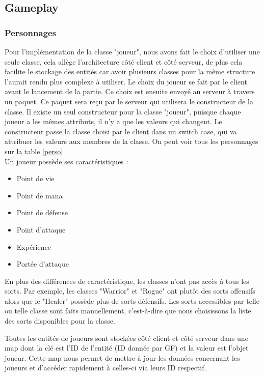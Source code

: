 \documentclass[a4paper, 12pt, twoside]{article}
\begin{document}
\subsection{Gameplay}

\subsubsection{Personnages}
Pour l'implémentation de la classe "joueur", nous avons fait le choix d'utiliser une seule classe, cela allège l'architecture côté client et côté serveur, de plus cela facilite le stockage des entités car avoir plusieurs classes pour la même structure l'aurait rendu plus complexe à utiliser. Le choix du joueur se fait par le client avant le lancement de la partie. Ce choix est ensuite envoyé au serveur à travers un paquet. Ce paquet sera reçu par le serveur qui utilisera le constructeur de la classe. Il existe un seul constructeur pour la classe "joueur", puisque chaque joueur a les mêmes attributs, il n'y a que les valeurs qui changent. Le constructeur passe la classe choisi par le client dans un switch case, qui va attribuer les valeurs aux membres de la classe. On peut voir tous les personnages sur la table \ref{perso} \\ 
Un joueur possède ses caractéristiques : \\
\begin{table}[h]
\begin{center}
    \begin{minipage}{10cm}
        \begin{itemize}
            \item Point de vie
            \item Point de mana
            \item Point de défense 
            \item Point d'attaque 
            \item Expérience 
            \item Portée d'attaque
        \end{itemize}
    \end{minipage}
\end{center}
\end{table}
En plus des différences de caractéristique, les classes n'ont pas accès à tous les sorts. Par exemple, les classes "Warrior" et "Rogue" ont plutôt des sorts offensifs alors que le "Healer" possède plus de sorts défensifs. Les sorts accessibles par telle ou telle classe sont faits manuellement, c'est-à-dire que nous choisissons la liste des sorts disponibles pour la classe. \par
Toutes les entités de joueurs sont stockées côté client et côté serveur dans une map dont la clé est l'ID de l'entité (ID donnée par GF) et la valeur est l'objet joueur. Cette map nous permet de mettre à jour les données concernant les joueurs et d'accéder rapidement à celles-ci via leurs ID respectif.
\end{document}
